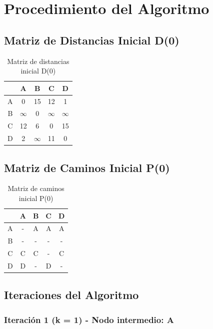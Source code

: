 \documentclass[12pt]{article}
\begin{document}
\clearpage
\section{Procedimiento del Algoritmo}
\subsection{Matriz de Distancias Inicial D(0)}
\begin{table}[h!]
\centering
\begin{tabular}{|c|c|c|c|c|}
\hline
 & A & B & C & D \\\hline
A & 0 & 15 & 12 & 1 \\\hline
B & $\infty$ & 0 & $\infty$ & $\infty$ \\\hline
C & 12 & 6 & 0 & 15 \\\hline
D & 2 & $\infty$ & 11 & 0 \\\hline
\end{tabular}
\caption{Matriz de distancias inicial D(0)}
\end{table}

\clearpage
\subsection{Matriz de Caminos Inicial P(0)}
\begin{table}[h!]
\centering
\begin{tabular}{|c|c|c|c|c|}
\hline
 & A & B & C & D \\\hline
A & - & A & A & A \\\hline
B & - & - & - & - \\\hline
C & C & C & - & C \\\hline
D & D & - & D & - \\\hline
\end{tabular}
\caption{Matriz de caminos inicial P(0)}
\end{table}

\clearpage
\subsection{Iteraciones del Algoritmo}
\clearpage
\subsubsection{Iteración 1 (k = 1) - Nodo intermedio: A}
\end{document}
